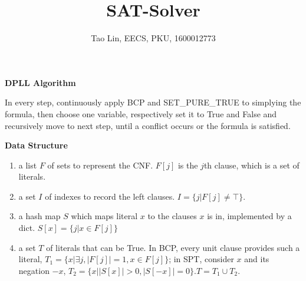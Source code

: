 \documentclass{article}
\title{SAT-Solver}
\author{Tao Lin, EECS, PKU, 1600012773}
\begin{document}
	
	\maketitle

	\textbf{DPLL Algorithm}
	
	In every step, continuously apply BCP and SET\_PURE\_TRUE to simplying the formula, then choose one variable, respectively set it to True and False and recursively move to next step, until a conflict occurs or the formula is satisfied.

	\textbf{Data Structure}
	\begin{enumerate}
		\item a list $F$ of sets to represent the CNF. $F[j]$ is the $j$th clause, which is a set of literals.
		\item a set $I$ of indexes to record the left clauses. $I = \{ j | F[j] \ne \top\}$.
		\item a hash map $S$ which maps literal $x$ to the clauses $x$ is in, implemented by a dict. $S[x] = \{j | x \in F[j]\}$
		\item a set $T$ of literals that can be True. In BCP, every unit clause provides such a literal, $T_1 = \{x|\exists j, |F[j]|=1, x \in F[j]\}$; in SPT, consider $x$ and its negation $-x$, $T_2 = \{x| |S[x]|>0, |S[-x]|=0\}$.$T = T_1 \cup T_2$.
	\end{enumerate}
\end{document}

